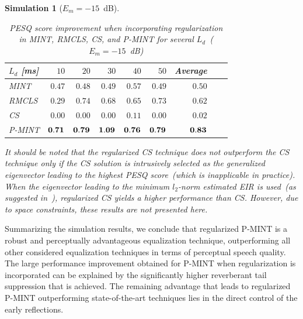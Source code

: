 \documentclass[10pt]{IEEEtran}
\newtheorem{simulation}{Simulation}
\begin{document}
\begin{simulation}[$E_m=-15$~dB]
\begin{table}[b!]
\centering
\caption{PESQ score improvement when incorporating regularization in MINT, RMCLS, CS, and P-MINT for several $L_d$~($E_m = -15$~dB)}
\label{tbl: pesq2}
\begin{tabular}{|l|r|r|r|r|r|r|r|r|}
\hline
$L_d$ [ms] & $10$ & $20$ & $30$ & $40$ & $50$ & Average  \\
\hline
MINT & $0.47$ & $0.48$ & $0.49$ & $0.57$ & $0.49$ & $0.50$ \\
\hline
RMCLS & $0.29$ & $0.74$ & $0.68$ & $0.65$ & $0.73$ & $0.62$ \\
\hline
CS & $0.00$ & $0.00$ & $0.00$ & $0.11$ & $0.00$ & $0.02$ \\
\hline
P-MINT & $\bf{0.71}$ & $\bf{0.79}$ & $\bf{1.09}$ & $\bf{0.76}$ & $\bf{0.79}$ & $\bf{0.83}$ \\
\hline
\end{tabular}
\end{table}

It should be noted that the regularized CS technique does not outperform the CS technique only if the CS solution is intrusively selected as the generalized eigenvector leading to the highest PESQ score~(which is inapplicable in practice). When the eigenvector leading to the minimum $l_2$-norm estimated EIR is used~(as suggested in~\cite{Zhang_IWAENC_2010}), regularized CS yields a higher performance than CS. However, due to space constraints, these results are not presented here.
\end{simulation}
Summarizing the simulation results, we conclude that regularized P-MINT is a robust and perceptually advantageous equalization technique, outperforming all other considered equalization techniques in terms of perceptual speech quality.
The large performance improvement obtained for P-MINT when regularization is incorporated can be explained by the significantly higher reverberant tail suppression that is achieved.
The remaining advantage that leads to regularized P-MINT outperforming state-of-the-art techniques lies in the direct control of the early reflections. 
\end{document}
